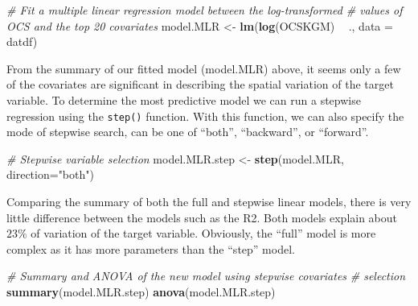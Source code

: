 \documentclass[10pt,b5paper,]{book}
\newenvironment{Shaded}{\begin{snugshade}}{\end{snugshade}}
\newcommand{\CommentTok}[1]{\textcolor[rgb]{0.56,0.35,0.01}{\textit{#1}}}
\newcommand{\DataTypeTok}[1]{\textcolor[rgb]{0.13,0.29,0.53}{#1}}
\newcommand{\KeywordTok}[1]{\textcolor[rgb]{0.13,0.29,0.53}{\textbf{#1}}}
\newcommand{\NormalTok}[1]{#1}
\newcommand{\OperatorTok}[1]{\textcolor[rgb]{0.81,0.36,0.00}{\textbf{#1}}}
\newcommand{\StringTok}[1]{\textcolor[rgb]{0.31,0.60,0.02}{#1}}
\theoremstyle{definition}
\theoremstyle{definition}
\theoremstyle{definition}
\theoremstyle{remark}
\begin{document}
\begin{Shaded}
\begin{Highlighting}[]
\CommentTok{# Fit a multiple linear regression model between the log-transformed}
\CommentTok{# values of OCS and the top 20 covariates}
\NormalTok{model.MLR <-}\StringTok{ }\KeywordTok{lm}\NormalTok{(}\KeywordTok{log}\NormalTok{(OCSKGM) }\OperatorTok{~}\StringTok{ }\NormalTok{., }\DataTypeTok{data =}\NormalTok{ datdf)}
\end{Highlighting}
\end{Shaded}

From the summary of our fitted model (model.MLR) above, it seems only a
few of the covariates are significant in describing the spatial
variation of the target variable. To determine the most predictive model
we can run a stepwise regression 
using the \texttt{step()} function. With this function, we can also
specify the mode of stepwise search, can be one of ``both'',
``backward'', or ``forward''.

\begin{Shaded}
\begin{Highlighting}[]
\CommentTok{# Stepwise variable selection}
\NormalTok{model.MLR.step <-}\StringTok{ }\KeywordTok{step}\NormalTok{(model.MLR, }\DataTypeTok{direction=}\StringTok{"both"}\NormalTok{)}
\end{Highlighting}
\end{Shaded}

Comparing the summary of both the full and stepwise linear models, there
is very little difference between the models such as the R2. Both models
explain about \(23\%\) of variation of the target variable. Obviously,
the ``full'' model is more complex as it has more parameters than the
``step'' model.

\begin{Shaded}
\begin{Highlighting}[]
\CommentTok{# Summary and ANOVA of the new model using stepwise covariates}
\CommentTok{# selection}
\KeywordTok{summary}\NormalTok{(model.MLR.step)}
\KeywordTok{anova}\NormalTok{(model.MLR.step)}
\end{Highlighting}
\end{Shaded}
\end{document}
